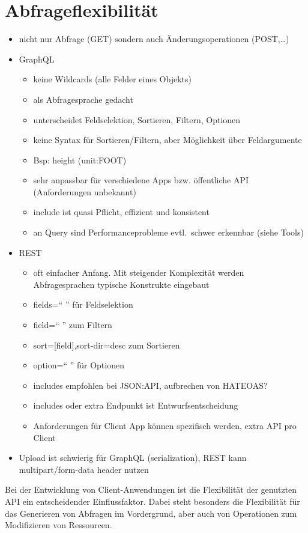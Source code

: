 \section{Abfrageflexibilität}
\begin{itemize}
  \item nicht nur Abfrage (GET) sondern auch Änderungsoperationen (POST,\dots)
  \item GraphQL
  \begin{itemize}
    \item keine Wildcards (alle Felder eines Objekts)
    \item als Abfragesprache gedacht
    \item unterscheidet Feldselektion, Sortieren, Filtern, Optionen
    \item keine Syntax für Sortieren/Filtern, aber Möglichkeit über Feldargumente
    \item Bsp: height (unit:FOOT)
    \item sehr anpassbar für verschiedene Apps bzw. öffentliche API (Anforderungen unbekannt)
    \item include ist quasi Pflicht, effizient und konsistent
    \item an Query sind Performanceprobleme evtl.\ schwer erkennbar (siehe Tools)
  \end{itemize}
  \item REST
  \begin{itemize}
    \item oft einfacher Anfang. Mit steigender Komplexität werden Abfragesprachen typische Konstrukte eingebaut
    \item fields=`` '' für Feldselektion
    \item field=`` '' zum Filtern
    \item sort=[field],sort-dir=desc zum Sortieren
    \item option=`` '' für Optionen
    \item includes empfohlen bei JSON:API, aufbrechen von HATEOAS\@?
    \item includes oder extra Endpunkt ist Entwurfsentscheidung
    \item Anforderungen für Client App können spezifisch werden, extra API pro Client
  \end{itemize}
  \item Upload ist schwierig für GraphQL (serialization), REST kann multipart/form-data header nutzen
\end{itemize}
Bei der Entwicklung von Client-Anwendungen ist die Flexibilität der genutzten API ein entscheidender Einflussfaktor.
Dabei steht besonders die Flexibilität für das Generieren von Abfragen im Vordergrund, aber auch von Operationen zum Modifizieren von Ressourcen.\par

